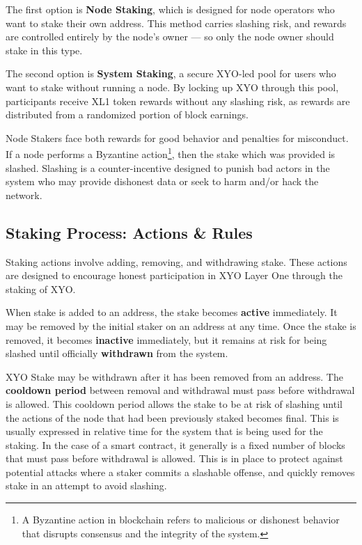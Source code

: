 \documentclass{article}
\begin{document}
The first option is \textbf{Node Staking}, which is designed for node operators
who want to stake their own address. This method carries slashing risk, and
rewards are controlled entirely by the node's owner — so only the node owner
should stake in this type.

The second option is \textbf{System Staking}, a secure XYO-led pool for users
who want to stake without running a node. By locking up XYO through this pool,
participants receive XL1 token rewards without any slashing risk, as rewards
are distributed from a randomized portion of block earnings.

Node Stakers face both rewards for good behavior and penalties for misconduct.
If a node performs a Byzantine action\footnote{A Byzantine action in blockchain
    refers to malicious or dishonest behavior that disrupts consensus and the
    integrity of the system.}, then the stake which was provided is slashed.
Slashing is a counter-incentive designed to punish bad actors in the system who
may provide dishonest data or seek to harm and/or hack the network.

\subsection{Staking Process: Actions \& Rules}
Staking actions involve adding, removing, and withdrawing stake. These actions
are designed to encourage honest participation in XYO Layer One through the
staking of XYO.

When stake is added to an address, the stake becomes \textbf{active}
immediately. It may be removed by the initial staker on an address at any time.
Once the stake is removed, it becomes \textbf{inactive} immediately, but it
remains at risk for being slashed until officially \textbf{withdrawn} from the
system.

XYO Stake may be withdrawn after it has been removed from an address. The
\textbf{cooldown period} between removal and withdrawal must pass before
withdrawal is allowed. This cooldown period allows the stake to be at risk of
slashing until the actions of the node that had been previously staked becomes
final. This is usually expressed in relative time for the system that is being
used for the staking. In the case of a smart contract, it generally is a fixed
number of blocks that must pass before withdrawal is allowed. This is in place
to protect against potential attacks where a staker commits a slashable
offense, and quickly removes stake in an attempt to avoid slashing.
\end{document}
